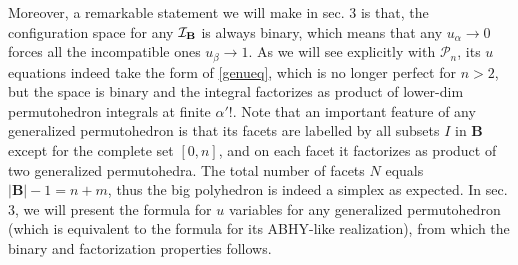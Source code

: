 \documentclass[hidelinks,12pt]{article}
\begin{document}
Moreover, a remarkable statement we will make in sec. 3 is that, the configuration space for any ${\cal I}_{\mathbf B}$ is always binary, which means that any $u_\alpha \to 0$ forces all the incompatible ones $u_\beta\to 1$. As we will see explicitly with ${\mathscr P}_n$, its $u$ equations indeed take the form of \eqref{genueq}, which is no longer perfect for $n>2$, but the space is binary and the integral factorizes as product of lower-dim permutohedron integrals at finite $\alpha'$!. Note that an important feature of any generalized permutohedron is that its facets are labelled by all subsets $I$ in ${\mathbf B}$ except for the complete set $[0,n]$, and on each facet it factorizes as product of two generalized permutohedra. The total number of facets $N$ equals $|{\mathbf B}|-1=n+m$, thus the big polyhedron is indeed a simplex as expected. In sec. 3, we will present the formula for $u$ variables for any generalized permutohedron (which is equivalent to the formula for its ABHY-like realization), from which the binary and factorization properties follows. 



\end{document}
